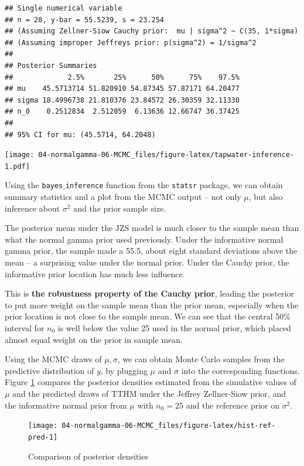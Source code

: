 \documentclass[]{book}
\theoremstyle{definition}
\theoremstyle{definition}
\theoremstyle{definition}
\theoremstyle{remark}
\begin{document}
\begin{verbatim}
## Single numerical variable
## n = 28, y-bar = 55.5239, s = 23.254
## (Assuming Zellner-Siow Cauchy prior:  mu | sigma^2 ~ C(35, 1*sigma)
## (Assuming improper Jeffreys prior: p(sigma^2) = 1/sigma^2
## 
## Posterior Summaries
##             2.5%       25%      50%      75%    97.5%
## mu    45.5713714 51.820910 54.87345 57.87171 64.20477
## sigma 18.4996738 21.810376 23.84572 26.30359 32.11330
## n_0    0.2512834  2.512059  6.13636 12.66747 36.37425
## 
## 95% CI for mu: (45.5714, 64.2048)
\end{verbatim}

\texttt{[image: 04-normalgamma-06-MCMC\_files/figure-latex/tapwater-inference-1.pdf]}

Using the \texttt{bayes$\_$inference} function from the \texttt{statsr}
package, we can obtain summary statistics and a plot from the MCMC
output -- not only \(\mu\), but also inference about \(\sigma^2\) and
the prior sample size.

The posterior mean under the JZS model is much closer to the sample mean
than what the normal gamma prior used previously. Under the informative
normal gamma prior, the sample made a 55.5, about eight standard
deviations above the mean -- a surprising value under the normal prior.
Under the Cauchy prior, the informative prior location has much less
influence.

This is \textbf{the robustness property of the Cauchy prior}, leading
the posterior to put more weight on the sample mean than the prior mean,
especially when the prior location is not close to the sample mean. We
can see that the central 50\% interval for \(n_0\) is well below the
value 25 used in the normal prior, which placed almost equal weight on
the prior in sample mean.

Using the MCMC draws of \(\mu, \sigma\), we can obtain Monte Carlo
samples from the predictive distribution of \(y\), by plugging \(\mu\)
and \(\sigma\) into the corresponding functions. Figure
\ref{fig:hist-ref-pred} compares the posterior densities estimated from
the simulative values of \(\mu\) and the predicted draws of TTHM under
the Jeffrey Zellner-Siow prior, and the informative normal prior from
\(\mu\) with \(n_0 = 25\) and the reference prior on \(\sigma^2\).

\begin{figure}

{\centering \texttt{[image: 04-normalgamma-06-MCMC\_files/figure-latex/hist-ref-pred-1]} 

}

\caption{Comparison of posterior densities}\label{fig:hist-ref-pred}
\end{figure}
\end{document}
